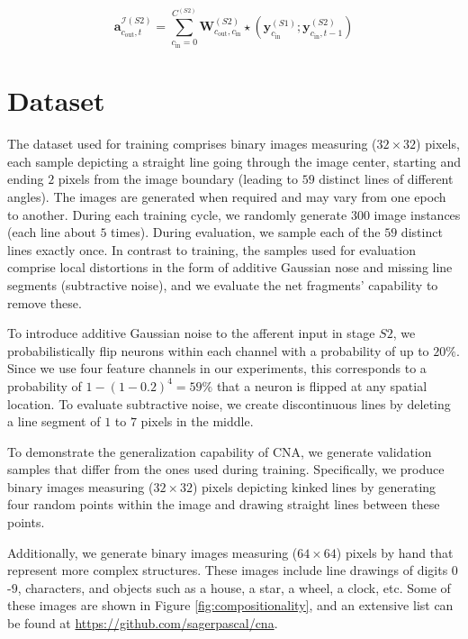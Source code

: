 \documentclass[12pt]{article}
\begin{document}
\begin{equation}
  \boldsymbol{a}^{\mathcal{I}(S2)}_{c_{\text{out}},t} = \sum_{c_\text{in}=0}^{C^{(S2)}} \boldsymbol{W}^{(S2)}_{c_{\text{out}}, c_{\text{in}}} \star \left( \boldsymbol{y}_{c_{\text{in}}}^{(S1)}; \boldsymbol{y}_{c_{\text{in}},t-1}^{(S2)} \right)
  \label{eq:a_a22}
\end{equation}


\section{Dataset} \label{sec:dataset}
The dataset used for training comprises binary images measuring ($32 \times 32$) pixels, each sample depicting a straight line going through the image center, starting and ending $2$ pixels from the image boundary  (leading to $59$ distinct lines of different angles).
The images are generated when required and may vary from one epoch to another.
During each training cycle, we randomly generate $300$ image instances (each line about $5$ times).
During evaluation, we sample each of the $59$ distinct lines exactly once.
In contrast to training, the samples used for evaluation comprise local distortions in the form of additive Gaussian nose and missing line segments (subtractive noise), and we evaluate the net fragments' capability to remove these.

To introduce additive Gaussian noise to the afferent input in stage $S2$, we probabilistically flip neurons within each channel with a probability of up to $20\%$. Since we use four feature channels in our experiments, this corresponds to a probability of $1-(1-0.2)^4=59\%$ that a neuron is flipped at any spatial location. %
To evaluate subtractive noise, we create discontinuous lines by deleting a line segment of $1$ to $7$ pixels in the middle.

To demonstrate the generalization capability of CNA, we generate validation samples that differ from the ones used during training. Specifically, we produce binary images measuring ($32 \times 32$) pixels depicting kinked lines by generating four random points within the image and drawing straight lines between these points.

Additionally, we generate binary images measuring ($64 \times 64$) pixels by hand that represent more complex structures.
These images include line drawings of digits $0$-$9$, characters, and objects such as a house, a star, a wheel, a clock, etc. Some of these images are shown in Figure \ref{fig:compositionality}, and an extensive list can be found at \url{https://github.com/sagerpascal/cna}.
\end{document}
